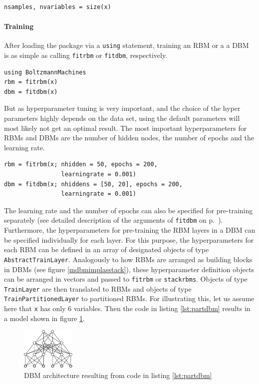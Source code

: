\documentclass[12pt]{article}
\newcommand{\inlinecode}[1]{\texttt{#1}}
\begin{document}
\begin{lstlisting}
nsamples, nvariables = size(x)
\end{lstlisting}

\paragraph{Training}

After loading the package via a \inlinecode{using} statement, training an RBM or a a DBM is as simple as calling \inlinecode{fitrbm} or \inlinecode{fitdbm}, respectively.

\begin{lstlisting}
using BoltzmannMachines
rbm = fitrbm(x)
dbm = fitdbm(x)
\end{lstlisting}

But as hyperparameter tuning is very important, and the choice of the hyper parameters highly depends on the data set, using the default parameters will most likely not get an optimal result.
The most important hyperparameters for RBMs and DBMs are the number of hidden nodes, the number of epochs and the learning rate.

\begin{lstlisting}
rbm = fitrbm(x; nhidden = 50, epochs = 200, 
                learningrate = 0.001)
dbm = fitdbm(x; nhiddens = [50, 20], epochs = 200, 
                learningrate = 0.001)
\end{lstlisting}

The learning rate and the number of epochs can also be specified for pre-training separately (see detailed description of the arguments of \inlinecode{fitdbm} on p.\ \pageref{bms_fitdbm}).
Furthermore, the hyperparameters for pre-training the RBM layers in a DBM can be specified individually for each layer.
For this purpose, the hyperparameters for each RBM can be defined in an array of designated objects of type \inlinecode{AbstractTrainLayer}.
Analogously to how RBMs are arranged as building blocks in DBMs (see figure  \ref{mdbmimplasstack}), these hyperparameter definition objects can be arranged in vectors and passed to \inlinecode{fitrbm} or \inlinecode{stackrbms}.
Objects of type \inlinecode{TrainLayer} are then translated to RBMs and objects of type \inlinecode{TrainPartitionedLayer} to partitioned RBMs.
For illustrating this, let us assume here that \inlinecode{x} has only 6 variables.
Then the code in listing \ref{lst:partdbm} results in a model shown in figure \ref{fig:smallpartitioneddbm}.

\begin{figure}[h]
   \centering
   \includegraphics[scale=3.]{images/SmallPartitionedDBM.pdf}
   \caption{DBM architecture resulting from code in listing \ref{lst:partdbm}}
\label{fig:smallpartitioneddbm}
\end{figure}
\end{document}
